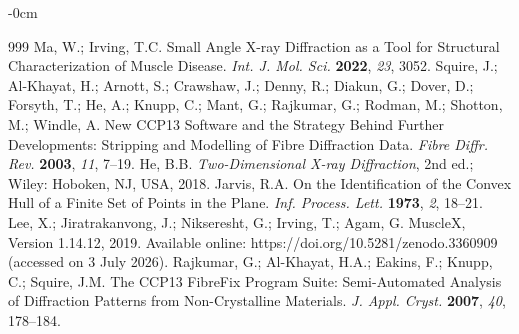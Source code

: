 \documentclass[journal,article,submit,moreauthors]{Definitions/mdpi}
\begin{document}
\begin{adjustwidth}{-\extralength}{0cm}
\begin{thebibliography}{999}
Ma, W.; Irving, T.C. Small Angle X-ray Diffraction as a Tool for Structural Characterization of Muscle Disease. {\em Int. J. Mol. Sci.} {\bf 2022}, {\em 23}, 3052.
Squire, J.; Al-Khayat, H.; Arnott, S.; Crawshaw, J.; Denny, R.; Diakun, G.; Dover, D.; Forsyth, T.; He, A.; Knupp, C.; Mant, G.; Rajkumar, G.; Rodman, M.; Shotton, M.; Windle, A. New CCP13 Software and the Strategy Behind Further Developments: Stripping and Modelling of Fibre Diffraction Data. {\em Fibre Diffr. Rev.} {\bf 2003}, {\em 11}, 7--19.
He, B.B. \textit{Two-Dimensional X-ray Diffraction}, 2nd ed.; Wiley: Hoboken, NJ, USA, 2018.
Jarvis, R.A. On the Identification of the Convex Hull of a Finite Set of Points in the Plane. {\em Inf. Process. Lett.} {\bf 1973}, {\em 2}, 18--21.
Lee, X.; Jiratrakanvong, J.; Nikseresht, G.; Irving, T.; Agam, G. MuscleX, Version 1.14.12, 2019. Available online: https://doi.org/10.5281/zenodo.3360909 (accessed on 3 July 2026).
Rajkumar, G.; Al-Khayat, H.A.; Eakins, F.; Knupp, C.; Squire, J.M. The CCP13 FibreFix Program Suite: Semi-Automated Analysis of Diffraction Patterns from Non-Crystalline Materials. {\em J. Appl. Cryst.} {\bf 2007}, {\em 40}, 178--184.


\end{thebibliography}
\end{adjustwidth}
\end{document}
